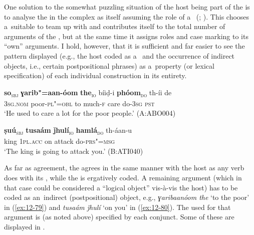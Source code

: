 \begin{exe}
One solution to the somewhat puzzling situation of the host being part of the  is to analyse the  in the complex as itself assuming the role of a~ (\citealt[204--212]{verma1993}; \citealt[164--170]{mohanan1993}). This  chooses a~suitable  to team up with and contributes itself to the total number of arguments of the , but at the same time it assigns roles and case marking to its ``own'' arguments. I hold, however, that it is sufficient and far easier to see the  pattern displayed (e.g., the host coded as a~ and the occurrence of indirect objects, i.e., certain postpositional phrases) as a~property (or lexical specification) of each individual construction in its entirety. 

\begin{exe}
\ex
\label{ex:12-79}
\gll {\ob}\textbf{so}{\cb}\textsubscript{\textsc{\upshape sbj}} {\ob}\textbf{ɣarib"=aan-óom} \textbf{the}{\cb}\textsubscript{\textsc{\upshape io}} bíiḍ-i {\ob}\textbf{phóom}{\cb}\textsubscript{\textsc{\upshape do}} th-íi de\\
\textsc{3sg.nom} poor-\textsc{pl"=obl} to much-\textsc{f} care do-\textsc{3sg}  \textsc{pst} \\
\glt `He used to care a lot for the poor people.' (A:ABO004)
\end{exe}
\begin{exe}
\ex
\label{ex:12-80}
\gll {\ob}\textbf{ṣuú}{\cb}\textsubscript{\textsc{\upshape sbj}} {\ob}\textbf{tusaám} \textbf{ǰhulí}{\cb}\textsubscript{\textsc{\upshape io}} {\ob}\textbf{hamlá}{\cb}\textsubscript{\textsc{\upshape do}} th-áan-u\\
king \textsc{1pl.acc} on attack do-\textsc{prs"=msg}\\
\glt `The king is going to attack you.' (B:ATI040)
\end{exe}

As far as  agreement, the  agrees in the same manner with the host as any  verb does with its , while the  is ergatively coded. A remaining argument (which in that case could be considered a ``logical object'' vis-à-vis the host) has to be coded as an~indirect (postpositional) object, e.g., \textit{ɣaribaanóom the} `to the poor' in (\ref{ex:12-79}) and \textit{tusaám ǰhulí} `on you' in (\ref{ex:12-80}). The  used for that argument is (as noted above) specified by each conjunct. Some of these are displayed in .



\end{exe}
